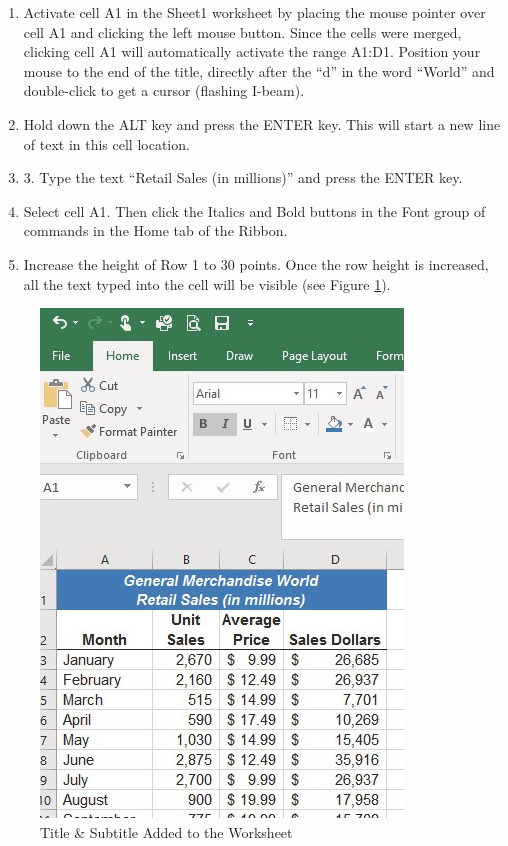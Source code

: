 \begin{enumerate}
	\item Activate cell \textsf{A1} in the Sheet1 worksheet by placing the mouse pointer over cell \textsf{A1} and clicking the left mouse button. Since the cells were merged, clicking cell \textsf{A1} will automatically activate the range \textsf{A1:D1}. Position your mouse to the end of the title, directly after the ``d'' in the word ``World'' and double-click to get a cursor (flashing I-beam).
	\item Hold down the ALT key and press the ENTER key. This will start a new line of text in this cell location.
	\item 3. Type the text ``Retail Sales (in millions)'' and press the ENTER key.
	\item Select cell \textsf{A1}. Then click the Italics and Bold buttons in the Font group of commands in the Home tab of the Ribbon.
	\item Increase the height of Row 1 to 30 points. Once the row height is increased, all the text typed into the cell will be visible (see Figure \ref{01:fig41}).

\end{enumerate}

\begin{figure}[H]
	\centering
	\includegraphics[width=\maxwidth{.95\linewidth}]{gfx/ch01_fig41}
	\caption{Title \& Subtitle Added to the Worksheet}
	\label{01:fig41}
\end{figure}


